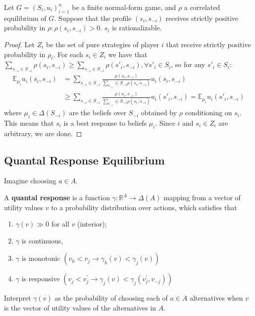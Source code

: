 \documentclass[11pt]{elegantbook_2}
\begin{document}
\begin{proposition}
    Let $G = (S_i, u_i)_{i=1}^n$ be a finite normal-form game, and $\rho$ a correlated equilibrium of $G$. Suppose that the profile $(s_i, s_{-i})$ receives strictly positive probability in $\rho: \rho(s_i, s_{-i}) > 0$. $s_i$ is rationalizable.
\end{proposition}
\begin{proof}
    Let $Z_i$ be the set of pure strategies of player $i$ that receive strictly positive probability in $\rho_i$. For each $s_i \in Z_i$ we have that $\sum_{s_{-i}\in S_{-i}} \rho(s_i, s_{-i}) \geq \sum_{s_{-i}\in S_{-i}} \rho(s'_i, s_{-i}),\forall s'_i\in S_i$, so for any $s'_i\in S_i$:
    \begin{equation}
        \begin{aligned}
            \mathbb{E}_{\mu_i}u_i(s_i,s_{-i})&=\sum_{s_{-i}\in S_{-i}}\frac{\rho(s_i, s_{-i})}{\sum_{\tilde{s}_{-i}}\in S_{-i}\rho(s_i,\tilde{s}_{-i})}u_i(s_i,s_{-i})\\
            &\geq \sum_{s_{-i}\in S_{-i}}\frac{\rho(s_i, s_{-i})}{\sum_{\tilde{s}_{-i}}\in S_{-i}\rho(s_i,\tilde{s}_{-i})}u_i(s'_i,s_{-i})=\mathbb{E}_{\mu_i}u_i(s'_i,s_{-i})
        \end{aligned}
        \nonumber
    \end{equation}
    where $\mu_{i}\in\Delta(S_{-i})$ are the beliefs over $S_{-i}$ obtained by $\rho$ conditioning on $s_i$. This means that $s_i$ is a best response to beliefs $\mu_i$. Since $i$ and $s_i\in Z_i$ are arbitrary, we are done.
\end{proof}


\subsection{Quantal Response Equilibrium}
Imagine choosing $a \in A$.
\begin{definition}
    A \textbf{quantal response} is a function $\gamma: \mathbb{R}^A \rightarrow \Delta(A)$ mapping from a vector of utility values $v$ to a probability distribution over actions, which satisfies that
    \begin{enumerate}[$\circ$]
        \item $\gamma(v) \gg 0$ for all $v$ (interior);
        \item $\gamma$ is continuous,
        \item $\gamma$ is monotonic $\left(v_h<v_j \rightarrow \gamma_h(v)<\gamma_j(v)\right)$
        \item $\gamma$ is responsive $\left(v_j<v_j^{\prime} \rightarrow \gamma_j(v)<\gamma_j\left(v_j^{\prime}, v_{-j}\right)\right)$
    \end{enumerate}
\end{definition}
Interpret $\gamma(v)$ as the probability of choosing each of $a \in A$ alternatives when $v$ is the vector of utility values of the alternatives in $A$.
\end{document}
